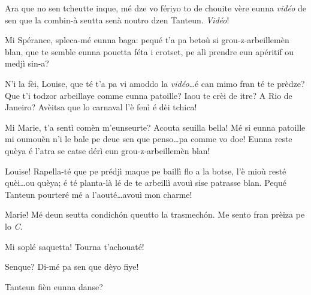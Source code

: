 \begin{drama}


\Mariespeaks Ara que no sen tcheutte inque, mé dze vo fériyo to de chouite vère eunna \textit{vidéo} de sen que la combin-à seutta senà noutro dzen Tanteun. \textit{Vidéo}!



\Louisespeaks Mi Spérance, spleca-mé eunna baga: pequé t'a pa betoù si grou-z-arbeillemèn blan, que te semble eunna pou\-et\-ta féta i crotset, pe alì prendre eun apéritif ou medjì sin-a?

\Sperancespeaks  N'i la fèi, Louise, que té t'a pa vi amoddo la \textit{vidéo}\ldots é can mimo fran té te prèdze? Que t'i todzor arbeillaye comme eunna patoille? Iaou te crèi de itre? A Rio de Janeiro? Avèitsa que lo carnaval l'è fenì é dèi tchica!

\Louisespeaks Mi Marie, t’a sentì comèn m’eunseurte? Acouta seuilla bella! Mé si eunna patoille mi oumouèn n'i le bale pe deue sen que penso\ldots pa comme vo doe! Eunna reste quèya é l'atra se catse dérì eun grou-z-arbeillemèn blan!

\Alicespeaks  Louise! Rapella-té que pe prédjì maque pe baillì flo a la botse, l’è mioù resté quèi\ldots ou quèya;  é té planta-là lé de te arbeillì avouì sise patrasse blan. Pequé Tanteun pourteré mé a l’aouté\ldots avouì mon charme!


\Sperancespeaks Marie! Mé deun seutta condich\'on queutto la trasmech\'on. Me sento fran prèiza pe lo \textit{C}.


\Alicespeaks Mi soplé saquetta! Tourna t'achouaté!

\Sperancespeaks Senque? Di-mé pa sen que dèyo fiye!


\Louisespeaks{} Tanteun fièn eunna danse?



\end{drama}
